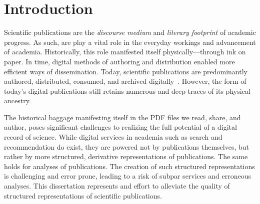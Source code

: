 \chapter{Introduction}
\label{chp:introduction}


Scientific publications are the \emph{discourse medium} and \emph{literary footprint} of academic progress. As such, are play a vital role in the everyday workings and advancement of academia.
Historically, this role manifested itself physically---through ink on paper. In time, digital methods of authoring %
and distribution enabled more efficient ways of dissemination.
Today, scientific publications are predominantly authored, distributed, consumed, and archived digitally~\cite{Lamers2018}. However, the form of today's digital publications still retains numerous and deep traces of its physical ancestry.




The historical baggage manifesting itself in the PDF files we read, share, and author, poses significant challenges to realizing the full potential of a digital record of science. While digital services in academia such as search and recommendation do exist, they are powered not by publications themselves, but rather by more structured, derivative representations of publications. The same holds for analyses of publications. The creation of such structured representations %
is challenging and error prone, leading to a risk of subpar services and erroneous analyses. This dissertation represents and effort to alleviate the quality of structured representations of scientific publications.

